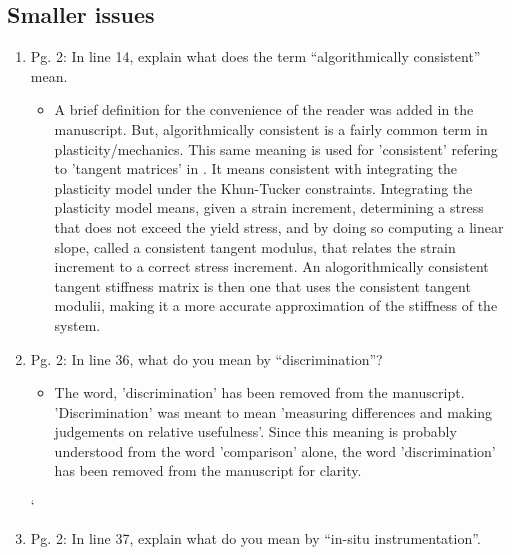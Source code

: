 \documentclass{article}
\begin{document}
  \subsection*{Smaller issues}
  \begin{enumerate}

  \item
	Pg. 2: In line 14, explain what does the term “algorithmically consistent” mean.

{\color{red}
  \begin{itemize}
     \item

      A brief definition for the convenience of the reader was added in the
      manuscript. But, algorithmically consistent is a fairly common term in
      plasticity/mechanics. This same meaning is used for 'consistent' refering
      to 'tangent matrices' in \cite{perez2012numerical, perez2000numerical}. It means
      consistent with integrating the plasticity model under the Khun-Tucker
      constraints. Integrating the plasticity model means, given a strain
      increment, determining a stress that does not exceed the yield stress,
      and by doing so computing a linear slope, called a consistent tangent
      modulus, that relates the strain increment to a correct stress increment.
      An alogorithmically consistent tangent stiffness matrix is then one that
      uses the consistent tangent modulii, making it a more accurate
      approximation of the stiffness of the system. 

  \end{itemize}}

  \item
	Pg. 2: In line 36, what do you mean by “discrimination”?

{\color{red}  
\begin{itemize}
     \item

      The word, 'discrimination' has been removed from the manuscript.
      'Discrimination' was meant to mean 'measuring differences and making
      judgements on relative usefulness'. Since this meaning is probably
      understood from the word 'comparison' alone, the word 'discrimination'
      has been removed from the manuscript for clarity.
      
  \end{itemize}}
	
` \item	
	Pg. 2: In line 37, explain what do you mean by “in-situ instrumentation”.


\end{enumerate}
\end{document}
